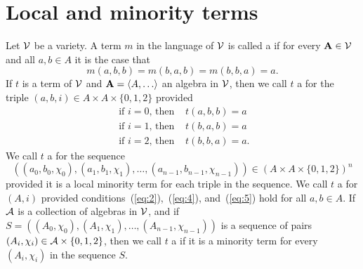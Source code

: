 \section{Local and \glocal minority terms}
Let $\mathcal{V}$ be a variety.  A term $m$ in the language of $\mathcal{V}$
is called a  if for every $\mathbf{A} \in \mathcal{V}$ and
all $a, b \in A$ it is the case that 
\[
m(a,b,b) =m(b,a,b) = m(b,b,a) = a.
\]
If $t$ is a term of $\mathcal{V}$ and $\bA = \<A, \dots\>$ an algebra in $\mathcal{V}$, 
then we call $t$ a  for the triple
$(a,b,i) \in A\times A \times \{0,1,2\}$ provided
\begin{align}
\text{ if $i=0$, then } & t(a, b, b)= a\label{eq:2}\\
\text{ if $i=1$, then } & t(b,a,b) = a\label{eq:4}\\
\text{ if $i=2$, then } & t(b,b,a) = a\label{eq:5}. 
\end{align}
We call $t$ a
 for the sequence
\[
((a_0, b_0, \chi_0), (a_1, b_1, \chi_1), \dots, (a_{n-1}, b_{n-1}, \chi_{n-1}))
\in (A\times A \times \{0,1,2\})^n\]
provided it is a local minority term for each triple in the sequence.
We call $t$ a  for 
$(A,i)$ provided conditions~(\ref{eq:2}),~(\ref{eq:4}), and~(\ref{eq:5}) hold
for all $a, b \in A$.
If $\mathcal{A}$ is a collection of algebras in $\mathcal{V}$, and if
$S = ((A_0, \chi_0), (A_1, \chi_1), \dots, (A_{n-1}, \chi_{n-1}))$
is a sequence of pairs $(A_i, \chi_i) \in \mathcal{A} \times \{0,1,2\}$, then
we call $t$ a  if it is a
\glocal minority term for every $(A_i, \chi_i)$ in the sequence
$S$.

